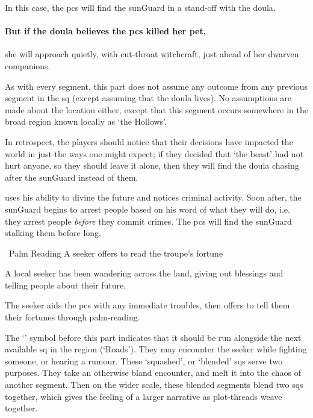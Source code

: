 \begin{multicols}{2}
In this case, the \glspl{pc} will find the \gls{sunGuard} in a stand-off with the \gls{doula}.

\paragraph{But if the \gls{doula} believes the \glspl{pc} killed her pet,}
she will approach quietly, with cut-throat witchcraft, just ahead of her dwarven companions.

As with every \gls{segment}, this part does not assume any outcome from any previous \gls{segment} in the \gls{sq} (except assuming that the \gls{doula} lives).
No assumptions are made about the location either, except that this segment occurs somewhere in the broad region known locally as `the Hollows'.

In retrospect, the players should notice that their decisions have impacted the world in just the ways one might expect; if they decided that `the beast' had not hurt anyone, so they should leave it alone, then they will find the \gls{doula} chasing after the \gls{sunGuard} instead of them.


\noindent
{} uses his ability to divine the future and notices criminal activity.
Soon after, the \gls{sunGuard} begins to arrest people based on his word of what they will do, i.e. they arrest people \emph{before} they commit crimes.
The \glspl{pc} will find the \gls{sunGuard} stalking them before long.

{\squash~Palm Reading}%
{A \gls{seeker} offers to read the troupe's fortune}%

\begin{exampletext}
  A local \gls{seeker} has been wandering across the land, giving out blessings and telling people about their future.
\end{exampletext}

The \gls{seeker} aids the \glspl{pc} with any immediate troubles, then offers to tell them their fortunes through palm-reading.

The `\squash' symbol before this part indicates that it should be run alongside the next available \gls{sq} in the region (`Roads').
They may encounter the \gls{seeker} while fighting someone, or hearing a rumour.
These `squashed', or `blended' \glspl{sq} serve two purposes.
They take an otherwise bland encounter, and melt it into the chaos of another \gls{segment}.
Then on the wider scale, these blended \glspl{segment} blend two \glspl{sq} together, which gives the feeling of a larger narrative as plot-threads weave together.


\end{multicols}
